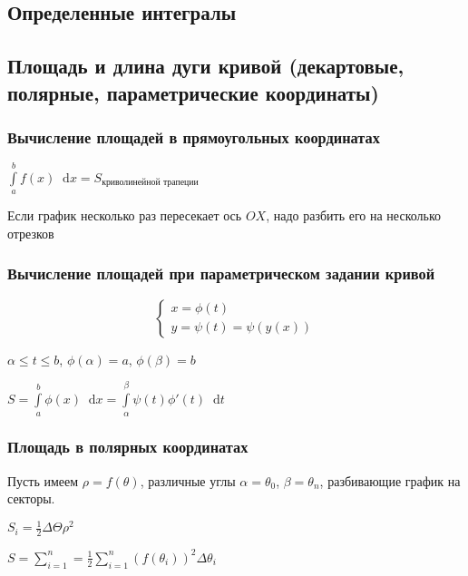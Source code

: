 \documentclass{article}
\newcommand*\diff{\mathop{}\!\mathrm{d}}
\begin{document}
\pagebreak
\subsection{Определенные интегралы}

\pagebreak
\subsection{Площадь и длина дуги кривой (декартовые, полярные, параметрические координаты)}

\subsubsection{Вычисление площадей в прямоугольных координатах}

$\int\limits_{a}^{b} f(x) \diff x = S_{\text{криволинейной трапеции}}$

Если график несколько раз пересекает ось $OX$, надо разбить его на несколько отрезков

\subsubsection{Вычисление площадей при параметрическом задании кривой}

\begin{equation}
\begin{cases}
    x = \phi(t) \\
    y = \psi(t) = \psi(y(x))
\end{cases}
\end{equation}

$\alpha \le t \le b$, $\phi(\alpha) = a$, $\phi(\beta) = b$

$S = \int\limits_{a}^{b} \phi(x) \diff x = \int\limits_{\alpha}^{\beta} \psi (t) \phi'(t) \diff t$

\subsubsection{Площадь в полярных координатах}

Пусть имеем $\rho = f (\theta)$, различные углы $\alpha = \theta_0$, $\beta = \theta_{n}$, разбивающие график на секторы.

\hfill

$S_{i} = \frac{1}{2} \Delta \Theta \rho^2$

$S = \sum\limits_{i = 1}^{n} = \frac{1}{2} \sum\limits_{i = 1}^{n} (f(\theta_i))^2 \Delta \theta_i$
\end{document}
